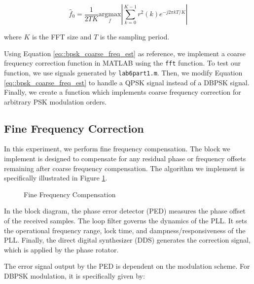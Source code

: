 \documentclass{article}
\begin{document}
\begin{equation}
	\label{eq::bpsk_coarse_freq_est}	
	\hat{f}_0 = \frac{1}{2TK}\underset{f}{\text{argmax}}\left\vert\sum_{k=0}^{K-1}{r^2(k)e^{-j2{\pi}kT/K}}\right\vert
\end{equation}

\noindent where $K$ is the FFT size and $T$ is the sampling period.

Using Equation \ref{eq::bpsk_coarse_freq_est} as reference, we implement a coarse frequency correction function in MATLAB using the \texttt{fft} function. To test our function, we use signals generated by \texttt{lab6part1.m}. Then, we modify Equation \ref{eq::bpsk_coarse_freq_est} to handle a QPSK signal instead of a DBPSK signal. Finally, we create a function which implements coarse frequency correction for arbitrary PSK modulation orders.

\subsection{Fine Frequency Correction}

In this experiment, we perform fine frequency compensation. The block we implement is designed to compensate for any residual phase or frequency offsets remaining after coarse frequency compensation. The algorithm we implement is specifically illustrated in Figure \ref{fig::fine_freq_comp_block_diagram}.

\begin{figure}[H]
	\centerline{}
	\caption{Fine Frequency Compensation}
	\label{fig::fine_freq_comp_block_diagram}
\end{figure}

In the block diagram, the phase error detector (PED) measures the phase offset of the received samples. The loop filter governs the dynamics of the PLL. It sets the operational frequency range, lock time, and dampness/responsiveness of the PLL. Finally, the direct digital synthesizer (DDS) generates the correction signal, which is applied by the phase rotator.

The error signal output by the PED is dependent on the modulation scheme. For DBPSK modulation, it is specifically given by:
\end{document}
